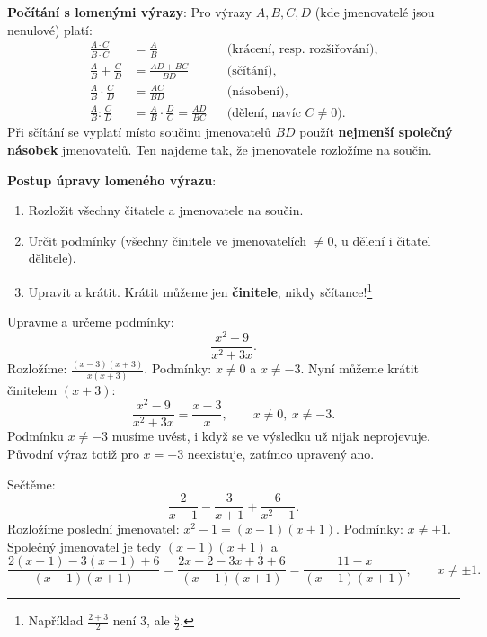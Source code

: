 \begin{definitionbox}
  \textbf{Počítání s lomenými výrazy}: Pro výrazy $A, B, C, D$ (kde jmenovatelé jsou nenulové) platí:
  \begin{align*}
    \frac{A\cdot C}{B\cdot C} &= \frac{A}{B} &&\text{(krácení, resp. rozšiřování),}\\
    \frac{A}{B} + \frac{C}{D} &= \frac{AD + BC}{BD} &&\text{(sčítání),}\\
    \frac{A}{B}\cdot\frac{C}{D} &= \frac{AC}{BD} &&\text{(násobení),}\\
    \frac{A}{B} : \frac{C}{D} &= \frac{A}{B}\cdot\frac{D}{C} = \frac{AD}{BC} &&\text{(dělení, navíc } C\neq 0\text{).}
  \end{align*}
  Při sčítání se vyplatí místo součinu jmenovatelů $BD$ použít \textbf{nejmenší společný násobek} jmenovatelů. Ten najdeme tak, že jmenovatele rozložíme na součin.

  \vspace{0.2cm}

  \textbf{Postup úpravy lomeného výrazu}:
  \begin{enumerate}
    \item Rozložit všechny čitatele a jmenovatele na součin.
    \item Určit podmínky (všechny činitele ve jmenovatelích $\neq 0$, u dělení i čitatel dělitele).
    \item Upravit a krátit. Krátit můžeme jen \textbf{činitele}, nikdy sčítance!\footnote{Například $\frac{2 + 3}{2}$ není $3$, ale $\frac{5}{2}$.}
  \end{enumerate}
\end{definitionbox}

\begin{example}
  Upravme a určeme podmínky:
  \begin{equation*}
    \frac{x^2 - 9}{x^2 + 3x}.
  \end{equation*}
  Rozložíme: $\frac{(x - 3)(x + 3)}{x(x + 3)}$. Podmínky: $x\neq 0$ a $x\neq -3$. Nyní můžeme krátit činitelem $(x + 3)$:
  \begin{equation*}
    \frac{x^2 - 9}{x^2 + 3x} = \frac{x - 3}{x}, \qquad x\neq 0,\ x\neq -3.
  \end{equation*}
  Podmínku $x\neq -3$ musíme uvést, i když se ve výsledku už nijak neprojevuje. Původní výraz totiž pro $x = -3$ neexistuje, zatímco upravený ano.
\end{example}

\begin{example}
  Sečtěme:
  \begin{equation*}
    \frac{2}{x - 1} - \frac{3}{x + 1} + \frac{6}{x^2 - 1}.
  \end{equation*}
  Rozložíme poslední jmenovatel: $x^2 - 1 = (x - 1)(x + 1)$. Podmínky: $x\neq\pm 1$. Společný jmenovatel je tedy $(x - 1)(x + 1)$ a
  \begin{equation*}
    \frac{2(x + 1) - 3(x - 1) + 6}{(x - 1)(x + 1)} = \frac{2x + 2 - 3x + 3 + 6}{(x - 1)(x + 1)} = \frac{11 - x}{(x - 1)(x + 1)}, \qquad x\neq\pm 1.
  \end{equation*}
\end{example}

